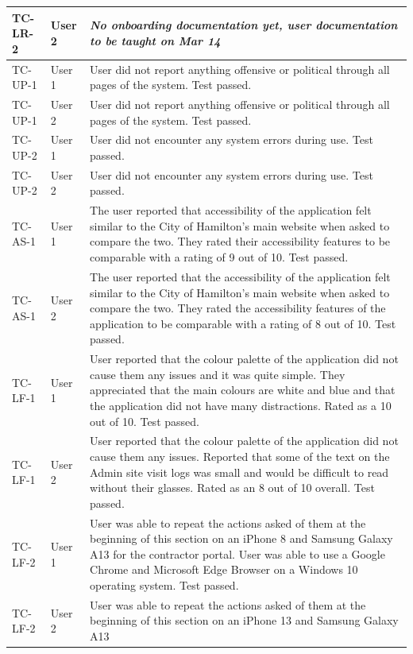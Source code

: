 \documentclass[12pt, titlepage]{article}
\begin{document}
\begin{longtable}{|m{2cm}|m{1.5cm}|m{9cm}|}
  \hline
  TC-LR-2 & User 2 & \textit{No onboarding documentation yet, user
  documentation to be taught on Mar 14}\\
  \hline
  TC-UP-1 & User 1& User did not report anything offensive or
  political through all pages of the system. Test passed.\\
  \hline
  TC-UP-1 & User 2& User did not report anything offensive or
  political through all pages of the system. Test passed.\\
  \hline
  TC-UP-2 & User 1& User did not encounter any system errors during
  use. Test passed.\\
  \hline
  TC-UP-2 & User 2& User did not encounter any system errors during
  use. Test passed.\\
  \hline
  TC-AS-1 & User 1& The user reported that accessibility of the
  application felt similar to the City of Hamilton's main website
  when asked to compare the two. They rated their accessibility
  features to be comparable with a rating of 9 out of 10. Test passed.\\
  \hline
  TC-AS-1 & User 2& The user reported that the accessibility of the
  application felt similar to the City of Hamilton's main
  website when asked to compare the two. They rated the accessibility
  features of the application to be comparable with a rating
  of 8 out of 10. Test passed.\\
  \hline
  TC-LF-1 & User 1& User reported that the colour palette of the
  application did not cause them any issues and it was quite simple.
  They appreciated that the main colours are white and blue and that
  the application did not have many distractions. Rated as a 10 out of 10.
  Test passed.\\
  \hline
  TC-LF-1 & User 2& User reported that the colour palette of the
  application did not cause them any issues.
  Reported that some of the text on the Admin site visit logs was
  small and would be difficult to read without their glasses.
  Rated as an 8 out of 10 overall. Test passed.\\
  \hline
  TC-LF-2 & User 1& User was able to repeat the actions asked of them
  at the beginning of this section on an iPhone 8 and Samsung Galaxy A13
  for the contractor portal. User was able to use a Google Chrome and
  Microsoft Edge Browser on a Windows 10 operating system. Test passed.\\
  \hline
  TC-LF-2 & User 2& User was able to repeat the actions asked of them
  at the beginning of this section on an iPhone 13 and Samsung Galaxy A13

\end{longtable}
\end{document}
